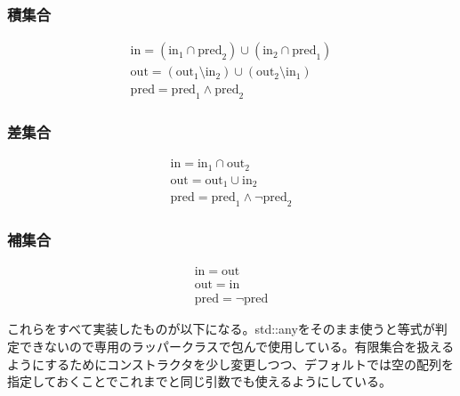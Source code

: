 \documentclass[a4paper,11pt]{ltjsarticle}
\begin{document}
\subsubsection{積集合}

\[
\begin{array}{l}
\mathrm{in}
=
(\mathrm{in}_1\cap\mathrm{pred}_2)
\cup
(\mathrm{in}_2\cap\mathrm{pred}_1)
\\[2mm]
\mathrm{out}
=
(\mathrm{out}_1\setminus\mathrm{in}_2)
\cup
(\mathrm{out}_2\setminus\mathrm{in}_1)
\\[2mm]
\mathrm{pred}
=
\mathrm{pred}_1\land\mathrm{pred}_2
\end{array}
\]

\subsubsection{差集合}

\[
\begin{array}{l}
\mathrm{in}
=
\mathrm{in}_1\cap\mathrm{out}_2
\\[2mm]
\mathrm{out}
=
\mathrm{out}_1\cup\mathrm{in}_2
\\[2mm]
\mathrm{pred}
=
\mathrm{pred}_1\land\lnot\mathrm{pred}_2
\end{array}
\]

\subsubsection{補集合}

\[
\begin{array}{l}
\mathrm{in}
=
\mathrm{out}
\\[2mm]
\mathrm{out}
=
\mathrm{in}
\\[2mm]
\mathrm{pred}
=
\lnot\mathrm{pred}
\end{array}
\]


これらをすべて実装したものが以下になる。std::anyをそのまま使うと等式が判定できないので専用のラッパークラスで包んで使用している。有限集合を扱えるようにするためにコンストラクタを少し変更しつつ、デフォルトでは空の配列を指定しておくことでこれまでと同じ引数でも使えるようにしている。
\end{document}
